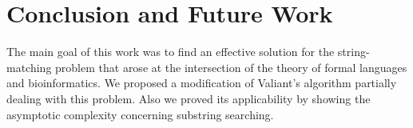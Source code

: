 \section{Conclusion and Future Work}

The main goal of this work was to find an effective solution for the string-matching problem that arose at the intersection of the theory of formal languages and bioinformatics. We proposed a modification of Valiant's algorithm partially dealing with this problem. Also we proved its applicability by showing the asymptotic complexity concerning substring searching.
